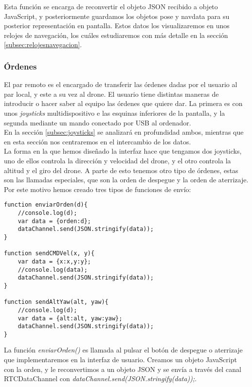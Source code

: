 Esta función se encarga de reconvertir el objeto JSON recibido a objeto JavaScript, y posteriormente guardamos los objetos pose y navdata para su posterior representación en pantalla. Estos datos los visualizaremos en unos relojes de navegación, los cuáles estudiaremos con más detalle en la sección \ref{subsec:relojesnavegacion}.\\


\subsubsection{Órdenes}\label{subsec:ordenes}

El par remoto es el encargado de transferir las órdenes dadas por el usuario al par local, y este a su vez al drone. El usuario tiene distintas maneras de introducir o hacer saber al equipo las órdenes que quiere dar. La primera es con unos \emph{joysticks} multidispositivo e las esquinas inferiores de la pantalla, y la segunda mediante un mando conectado por USB al ordenador.\\

En la sección \ref{subsec:joysticks} se analizará en profundidad ambos, mientras que en esta sección nos centraremos en el intercambio de los datos.\\

La forma en la que hemos diseñado la interfaz hace que tengamos dos joysticks, uno de ellos controla la dirección y velocidad del drone, y el otro controla la altitud y el giro del drone. A parte de esto tenemos otro tipo de órdenes, estas son las llamadas especiales, que son la orden de despegue y la orden de aterrizaje. Por este motivo hemos creado tres tipos de funciones de envío:\\

\begin{lstlisting}[caption=Funciones de envío de órdenes en el par remoto.]
function enviarOrden(d){
    //console.log(d);
    var data = {orden:d};
    dataChannel.send(JSON.stringify(data));
}

function sendCMDVel(x, y){
    var data = {x:x,y:y};
    //console.log(data);
    dataChannel.send(JSON.stringify(data));
}

function sendAltYaw(alt, yaw){
    //console.log(d);
    var data = {alt:alt, yaw:yaw};
    dataChannel.send(JSON.stringify(data));
}
\end{lstlisting}

La función \emph{enviarOrden()} es llamada al pulsar el botón de despegue o aterrizaje que implementaremos en la interfaz de usuario. Creamos un objeto JavaScript con la orden, y le reconvertimos a un objeto JSON y se envía a través del canal RTCDataChannel con \emph{dataChannel.send(JSON.stringify(data));}.\\


